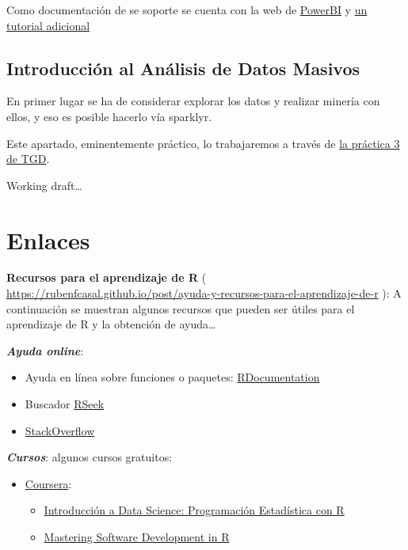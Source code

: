 \documentclass[
]{book}
\begin{document}
Como documentación de se soporte se cuenta con la web de \href{https://docs.microsoft.com/es-es/power-bi/}{PowerBI} y \href{https://ccance.net/manuales/powerbi/capitulo_01_introduccion.pdf}{un tutorial adicional}

\section{Introducción al Análisis de Datos Masivos}\label{introducciuxf3n-al-anuxe1lisis-de-datos-masivos}

En primer lugar se ha de considerar explorar los datos y realizar minería con ellos, y eso es posible hacerlo vía sparklyr.

Este apartado, eminentemente práctico, lo trabajaremos a través de \href{https://www.kaggle.com/gltaboada/t3-practice3-flights}{la práctica 3 de TGD}.

\appendix


Working draft\ldots{}

\chapter{Enlaces}\label{links}

\textbf{Recursos para el aprendizaje de R} ( \url{https://rubenfcasal.github.io/post/ayuda-y-recursos-para-el-aprendizaje-de-r}
): A continuación se muestran algunos recursos que pueden ser útiles para el aprendizaje de R y la obtención de ayuda\ldots{}

\textbf{\emph{Ayuda online}}:

\begin{itemize}
\item
  Ayuda en línea sobre funciones o paquetes: \href{https://www.rdocumentation.org/}{RDocumentation}
\item
  Buscador \href{http://rseek.org/}{RSeek}
\item
  \href{http://stackoverflow.com/questions/tagged/r}{StackOverflow}
\end{itemize}

\textbf{\emph{Cursos}}:
algunos cursos gratuitos:

\begin{itemize}
\item
  \href{https://www.coursera.org/}{Coursera}:

  \begin{itemize}
  \item
    \href{https://www.coursera.org/learn/intro-data-science-programacion-estadistica-r}{Introducción a Data Science: Programación Estadística con R}
  \item
    \href{https://www.coursera.org/specializations/r}{Mastering Software Development in R}
  \end{itemize}
\end{itemize}
\end{document}
